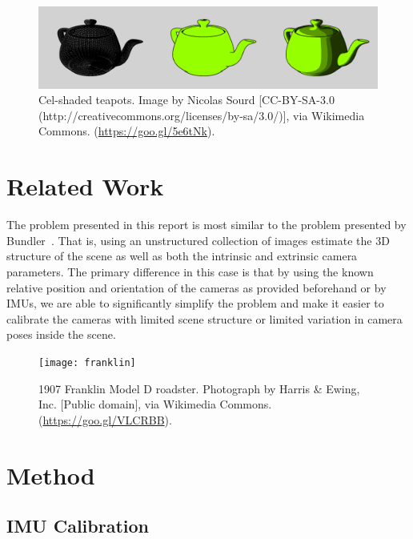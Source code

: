 \documentclass[preprint,acmtog]{acmart}
\begin{document}
\begin{figure}[ht]
  \centering
  \includegraphics[width=\linewidth]{teapots}
  \caption{Cel-shaded teapots. Image by Nicolas Sourd [CC-BY-SA-3.0 (http://creativecommons.org/licenses/by-sa/3.0/)], via Wikimedia Commons. (\url{https://goo.gl/5e6tNk}).}
\end{figure}


\section{Related Work}


The problem presented in this report is most similar to the problem presented by
Bundler~\cite{bundler2006}. That is, using an unstructured collection of images
estimate the 3D structure of the scene as well as both the intrinsic and
extrinsic camera parameters. The primary difference in this case is that by
using the known relative position and orientation of the cameras as provided
beforehand or by IMUs, we are able to significantly simplify the problem and
make it easier to calibrate the cameras with limited scene structure or limited
variation in camera poses inside the scene.



\begin{figure}[h]
  \centering
  \texttt{[image: franklin]}
  \caption{1907 Franklin Model D roadster. Photograph by Harris \& Ewing, Inc. [Public domain], via Wikimedia Commons. (\url{https://goo.gl/VLCRBB}).}
\end{figure}



\section{Method}

\subsection{IMU Calibration}
\end{document}
